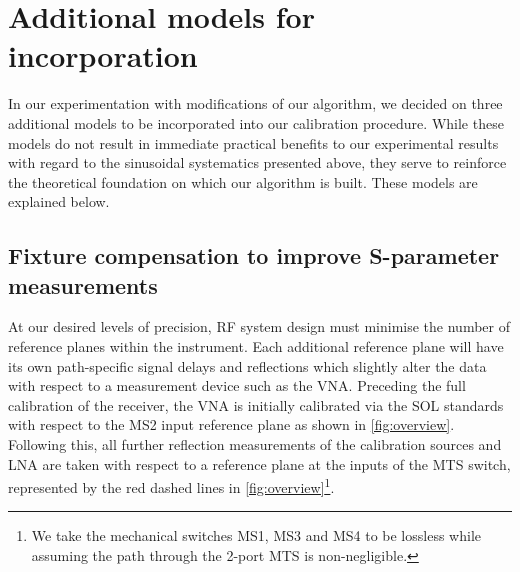 \section{Additional models for incorporation}\label{sec:additional_models}
In our experimentation with modifications of our algorithm, we decided on three additional models to be incorporated into our calibration procedure. While these models do not result in immediate practical benefits to our experimental results with regard to the sinusoidal systematics presented above, they serve to reinforce the theoretical foundation on which our algorithm is built. These models are explained below.

\subsection{Fixture compensation to improve S-parameter measurements}\label{sec:tparameters}
At our desired levels of precision, RF system design must minimise the number of reference planes within the instrument. Each additional reference plane will have its own path-specific signal delays and reflections which slightly alter the data with respect to a measurement device such as the VNA. Preceding the full calibration of the receiver, the VNA is initially calibrated via the SOL standards with respect to the MS2 input reference plane as shown in \cref{fig:overview}. Following this, all further reflection measurements of the calibration sources and LNA are taken with respect to a reference plane at the inputs of the MTS switch, represented by the red dashed lines in \cref{fig:overview}\footnote{We take the mechanical switches MS1, MS3 and MS4 to be lossless while assuming the path through the 2-port MTS is non-negligible.}.

